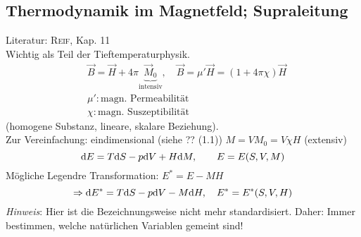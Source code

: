 \subsection{Thermodynamik im Magnetfeld; Supraleitung}
Literatur: \textsc{Reif}, Kap. 11\\
Wichtig als Teil der Tieftemperaturphysik.
\begin{equation}
    \begin{split}
        & \vec{B} = \vec{H} + 4 \pi \underbrace{\vec{M}_0}_{\text{intensiv}}, \quad \vec{B} = \mu' \vec{H} = (1 + 4 \pi \chi) \vec{H} \\
        & \mu': \text{magn. Permeabilität} \\
        & \chi: \text{magn. Suszeptibilität}
    \end{split}
\end{equation}
(homogene Substanz, lineare, skalare Beziehung). \\
Zur Vereinfachung: eindimensional (siehe ?? (1.1)) $M = V M_0 = V \chi H$ (extensiv)
\begin{equation}
    \mathrm{d} E = T \mathrm{d} S - p \mathrm{d} V + H \mathrm{d} M, \qquad E = E(S, V, M)
\end{equation}
Mögliche Legendre Transformation: $E^* = E - M H$
\begin{equation}
    \Rightarrow \mathrm{d} E^* = T \mathrm{d} S - p \mathrm{d} V - M \mathrm{d} H, \quad E^* =  E^*(S, V, H)
\end{equation}
\emph{Hinweis}: Hier ist die Bezeichnungsweise nicht mehr standardisiert. Daher: Immer bestimmen, welche natürlichen Variablen gemeint sind! \\
